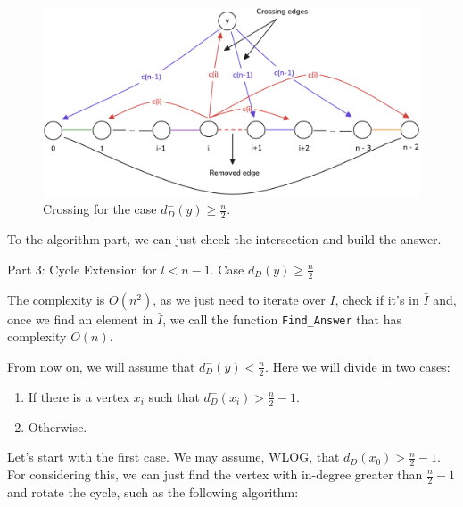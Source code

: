 \begin{figure}[H]
    \centering
    \includegraphics[width=1\textwidth]{figuras/cycle_n-1_crossing_1.png}
    \caption{Crossing for the case $d^-_D(y) \geq \frac{n}{2}$.}
    \label{fig:crossing_case_2}
\end{figure}

To the algorithm part, we can just check the intersection and build the answer.

\begin{algorithm}[H]
    \caption{Part 3: Cycle Extension for \( l < n - 1 \). Case \( d^-_D(y) \geq \frac{n}{2} \)}
    \begin{algorithmic}[1]
                    \State \Return {}
                \EndIf
            \EndFor
        \EndFunction
    \end{algorithmic}
\end{algorithm}

The complexity is $O(n^2)$, as we just need to iterate over $I$, check if it's in $\bar{I}$ and, once we find an element in $\bar{I}$, 
we call the function \texttt{Find\_Answer} that has complexity $O(n)$.

From now on, we will assume that $d^-_D(y) < \frac{n}{2}$. Here we will divide in two cases:

\begin{enumerate}
    \item If there is a vertex $x_i$ such that $d^-_D(x_i) > \frac{n}{2} - 1$.
    \item Otherwise.
\end{enumerate}

Let's start with the first case. We may assume, WLOG, that $d^-_D(x_0) > \frac{n}{2} - 1$.
For considering this, we can just find the vertex with in-degree greater than $\frac{n}{2} - 1$ and rotate the cycle, such as the following algorithm:

